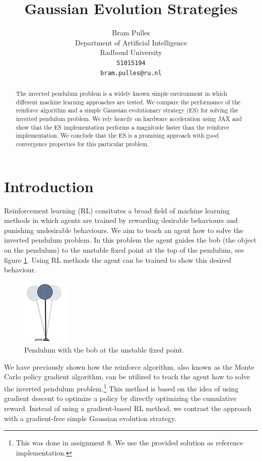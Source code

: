 \documentclass{article}
\title{Gaussian Evolution Strategies}
\author{%
  Bram Pulles\\
  Department of Artificial Intelligence\\
  Radboud University\\
  \texttt{S1015194}\\
  \texttt{bram.pulles@ru.nl} \\
}
\begin{document}
\maketitle


\begin{abstract}
	The inverted pendulum problem is a widely known simple environment in which
	different machine learning approaches are tested. We compare the
	performance of the reinforce algorithm and a simple Gaussian evolutionary
	strategy (ES) for solving the inverted pendulum problem. We rely heavily on
	hardware acceleration using JAX and show that the ES implementation
	performs a magnitude faster than the reinforce implementation. We conclude
	that the ES is a promising approach with good convergence properties for
	this particular problem.
\end{abstract}


\section{Introduction}
\label{sec: introduction}
Reinforcement learning (RL) consitutes a broad field of machine learning
methods in which agents are trained by rewarding desirable behaviours and
punishing undesirable behaviours. We aim to teach an agent how to solve the
inverted pendulum problem. In this problem the agent guides the bob (the object
on the pendulum) to the unstable fixed point at the top of the pendulum, see
figure \ref{fig: inverted pendulum}. Using RL methods the agent can be trained
to show this desired behaviour.

\begin{figure}[h]
	\centering
	\includegraphics[width = 0.2\textwidth]{images/inverted_pendulum.png}
	\caption{Pendulum with the bob at the unstable fixed point.}
	\label{fig: inverted pendulum}
\end{figure}

We have previously shown how the reinforce algorithm, also known as the Monte
Carlo policy gradient algorithm, can be utilized to teach the agent how to
solve the inverted pendulum problem.\footnote{This was done in assignment 8. We
use the provided solution as reference implementation.} This method is based on
the idea of using gradient descent to optimize a policy by directly optimizing
the cumulative reward. Instead of using a gradient-based RL method, we contrast
the approach with a gradient-free simple Gaussian evolution strategy.
\end{document}
